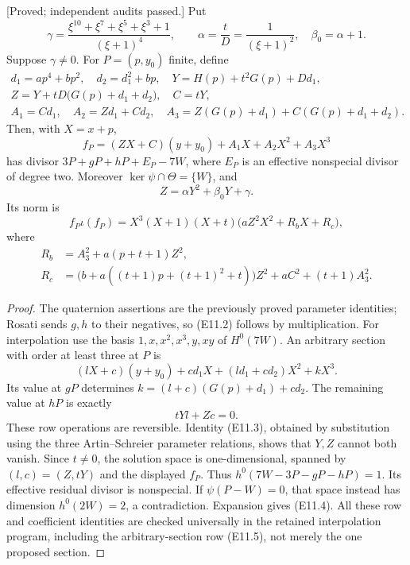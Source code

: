 \begin{lemma}
\label{lem:uniform-eleven-interpolation-candidate}
\textup{[Proved; independent audits passed.]}
Put
\[
 \gamma=\frac{\xi^{10}+\xi^7+\xi^5+\xi^3+1}{(\xi+1)^4},
 \qquad \alpha=\frac{t}{D}=\frac1{(\xi+1)^2},\quad
 \beta_0=\alpha+1.
\]
Suppose $\gamma\ne0$. For $P=(p,y_0)$ finite, define
\[
\begin{gathered}
 d_1=ap^4+bp^2,\quad d_2=d_1^2+bp,\quad
 Y=H(p)+t^2G(p)+Dd_1,\\
 Z=Y+tD\bigl(G(p)+d_1+d_2\bigr),\quad C=tY,\\
 A_1=Cd_1,\quad A_2=Zd_1+Cd_2,\quad
 A_3=Z(G(p)+d_1)+C(G(p)+d_1+d_2).
\end{gathered}
\]
Then, with $X=x+p$,
\[
 f_P=(ZX+C)(y+y_0)+A_1X+A_2X^2+A_3X^3
\]
has divisor $3P+gP+hP+E_P-7W$, where $E_P$ is an effective
nonspecial divisor of degree two. Moreover
$\ker\psi\cap\Theta=\{W\}$, and
\[
 Z=\alpha Y^2+\beta_0Y+\gamma.                   \tag{E11.3}
\]
Its norm is
\[
 f_P\iota(f_P)=X^3(X+1)(X+t)
       \bigl(aZ^2X^2+R_bX+R_c\bigr),            \tag{E11.4}
\]
where
\[
\begin{split}
 R_b&=A_3^2+a(p+t+1)Z^2,\\
 R_c&=\bigl(b+a((t+1)p+(t+1)^2+t)\bigr)Z^2
            +aC^2+(t+1)A_3^2.
\end{split}
\]
\end{lemma}
\begin{proof}
The quaternion assertions are the previously proved parameter identities;
Rosati sends $g,h$ to their negatives, so (E11.2) follows by multiplication.
For interpolation use the basis $1,x,x^2,x^3,y,xy$ of $H^0(7W)$.
An arbitrary section with order at least three at $P$ is
\[
 (lX+c)(y+y_0)+cd_1X+(ld_1+cd_2)X^2+kX^3.
\]
Its value at $gP$ determines
$k=(l+c)(G(p)+d_1)+cd_2$. The remaining value at $hP$ is exactly
\[
                 tYl+Zc=0.                    \tag{E11.5}
\]
These row operations are reversible. Identity (E11.3), obtained by
substitution using the three Artin--Schreier parameter relations, shows
that $Y,Z$ cannot both vanish. Since $t\ne0$, the solution space is
one-dimensional, spanned by $(l,c)=(Z,tY)$ and the displayed $f_P$.
Thus $h^0(7W-3P-gP-hP)=1$. Its effective residual divisor is nonspecial.
If $\psi(P-W)=0$, that space instead has dimension
$h^0(2W)=2$, a contradiction. Expansion gives (E11.4).
All these row and coefficient identities are checked universally in the
retained interpolation program, including the arbitrary-section row
(E11.5), not merely the one proposed section.
\end{proof}

